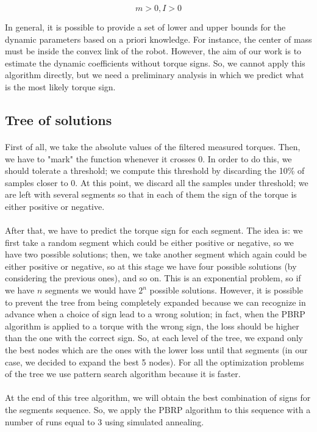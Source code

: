 \documentclass{article}
\begin{document}
\[m > 0, I > 0\]

In general, it is possible to provide a set of lower and upper bounds for the dynamic parameters based on a priori knowledge. For instance, the center of mass must be inside the convex link of the robot. However, the aim of our work is to estimate the dynamic coefficients without torque signs. So, we cannot apply this algorithm directly, but we need a preliminary analysis in which we predict what is the most likely torque sign.

\subsection{Tree of solutions}
\paragraph{}First of all, we take the absolute values of the filtered measured torques. Then, we have to "mark" the function whenever it crosses 0. In order to do this, we should tolerate a threshold; we compute this threshold by discarding the 10\% of samples closer to 0. At this point, we discard all the samples under threshold; we are left with several segments so that in each of them the sign of the torque is either positive or negative.
\paragraph{}After that, we have to predict the torque sign for each segment. The idea is: we first take a random segment which could be either positive or negative, so we have two possible solutions; then, we take another segment which again could be either positive or negative, so at this stage we have four possible solutions (by considering the previous ones), and so on. This is an exponential problem, so if we have $n$ segments we would have $2^n$ possible solutions. However, it is possible to prevent the tree from being completely expanded because we can recognize in advance when a choice of sign lead to a wrong solution; in fact, when the PBRP algorithm is applied to a torque with the wrong sign, the loss should be higher than the one with the correct sign. So, at each level of the tree, we expand only the best nodes which are the ones with the lower loss until that segments (in our case, we decided to expand the best 5 nodes). For all the optimization problems of the tree we use pattern search algorithm because it is faster.
\paragraph{}At the end of this tree algorithm, we will obtain the best combination of signs for the segments sequence. So, we apply the PBRP algorithm to this sequence with a number of runs equal to 3 using simulated annealing.
\end{document}
